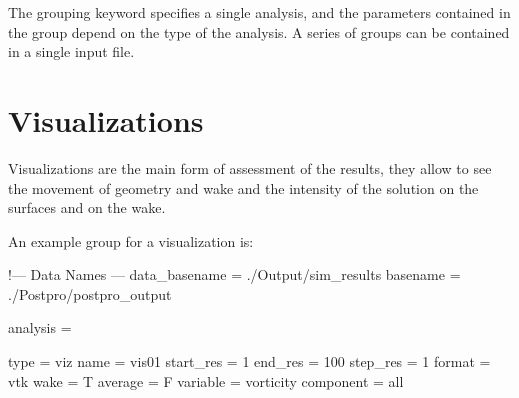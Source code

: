 The grouping keyword   specifies a single analysis, 
and the parameters contained in the group depend on the type of the analysis. 
A series of   groups can be contained in a single input file.

\section{Visualizations}

Visualizations are the main form of assessment of the results, 
they allow to see the movement of geometry and wake and the intensity 
of the solution on the surfaces and on the wake.

An example  group for a visualization is:

\begin{inputfile}[frame=single, caption={dust\_post.in for visualization}, 
  label={file:dust_post.in_viz}]
!--- Data Names ---
data_basename = ./Output/sim_results
basename =     ./Postpro/postpro_output

analysis = {

type = viz  
name = vis01
start_res = 1
end_res   = 100 
step_res  = 1
format = vtk
wake = T
average = F
variable = vorticity 
component = all

}
\end{inputfile}

